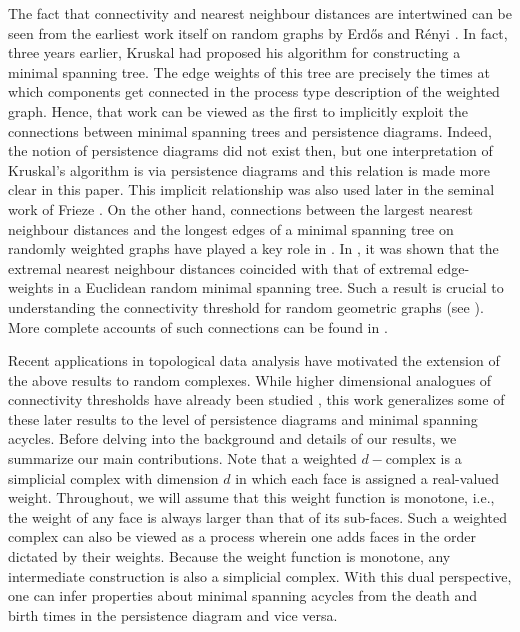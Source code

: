 \documentclass[12pt]{amsart}
\newcommand{\red}[1]{\textcolor{red}{#1}}
\newcommand{\dy}[1]{\textcolor{magenta}{#1}}
\newcommand{\gt}[1]{\textcolor{blue}{#1}}
\renewcommand{\red}[1]{#1}
\renewcommand{\dy}[1]{#1}
\renewcommand{\gt}[1]{#1}
\numberwithin{equation}{section}
\numberwithin{theorem}{section}
\newcommand{\1}{\mathbf{1}}
\begin{document}
The fact that connectivity and nearest neighbour distances are intertwined 
can be seen from the earliest work itself on random graphs by Erd\H{o}s and R\'{e}nyi \cite{Erdos59}. \gt{In fact, three years earlier,  Kruskal had proposed his algorithm  for constructing a minimal spanning tree. The edge weights of this tree are precisely the times at which components get connected in the process type description of the weighted graph. Hence, that work can be viewed as the first to implicitly exploit the connections between minimal spanning trees and persistence diagrams.} \dy{\gt{Indeed,} the notion of persistence diagrams did not exist then, but one interpretation of Kruskal's algorithm is via persistence diagrams and this \gt{relation} is made more clear in this paper.} %
This implicit relationship was also used later in the seminal work of Frieze \cite{Frieze85}. On the other hand, connections between the largest nearest neighbour distances and the longest edges of a minimal spanning tree on randomly weighted graphs have played a key role in \cite{Henze82, Steele86, Appel02, Penrose97, Hsing05}. In \cite{Penrose97}, it was shown that the extremal nearest neighbour distances coincided with that of extremal edge-weights in a Euclidean random minimal spanning tree. Such a result is crucial to understanding the connectivity threshold for random geometric graphs (see \cite[Chapter 13]{Penrose03}). More complete accounts of such connections can be found in \cite{Bollobas01, Hofstad16, Janson00, Penrose03, Frieze16}.

Recent applications in topological data analysis have motivated the extension of the above results to random complexes. While higher dimensional analogues of connectivity thresholds \gt{have} already been studied \cite{linial2006homological, meshulam2009homological, kahle2014sharp}, this work generalizes some of these later results to the level of persistence diagrams and minimal spanning acycles. Before delving into the background and details of our results, we summarize our main contributions. \gt{Note that a weighted $d-$complex is a simplicial complex with dimension $d$ in which each face is assigned a \dy{real-valued weight.} Throughout, we will assume that this weight function is monotone, i.e., the weight of any face is always larger than that of its sub-faces. Such a weighted complex can also be viewed as a process wherein one adds faces in the order dictated by their weights. Because the weight function is monotone, any  intermediate construction is also a simplicial complex. With this dual perspective, one can infer properties  about minimal spanning acycles from the death and birth times in the persistence diagram and vice versa.} 
\end{document}

